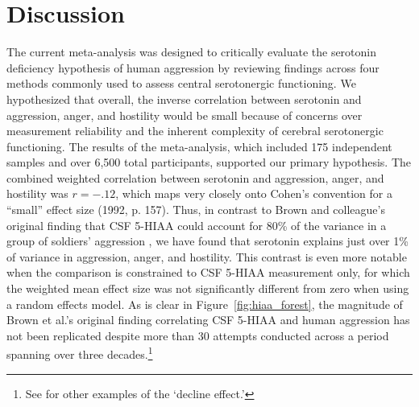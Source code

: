 % 
% 


\section{Discussion}
The current meta-analysis was designed to critically evaluate the serotonin deficiency hypothesis of human aggression by reviewing findings across four methods commonly used to assess central serotonergic functioning. We hypothesized that overall, the inverse correlation between serotonin and aggression, anger, and hostility would be small because of concerns over measurement reliability and the inherent complexity of cerebral serotonergic functioning. The results of the meta-analysis, which included 175 independent samples and over 6,500 total participants, supported our primary hypothesis. The combined weighted correlation between serotonin and aggression, anger, and hostility was $r = -.12$, which maps very closely onto Cohen's convention for a ``small'' effect size (1992, p. 157). Thus, in contrast to Brown and colleague's original finding that CSF 5-HIAA could account for 80\% of the variance in a group of soldiers' aggression \parencite{Brown79}, we have found that serotonin explains just over 1\% of variance in aggression, anger, and hostility. This contrast is even more notable when the comparison is constrained to CSF 5-HIAA measurement only, for which the weighted mean effect size was not significantly different from zero when using a random effects model. As is clear in Figure~\ref{fig:hiaa_forest}, the magnitude of Brown et al.'s original finding correlating CSF 5-HIAA and human aggression has not been replicated despite more than 30 attempts conducted across a period spanning over three decades.\footnote{See  for other examples of the `decline effect.'} 


